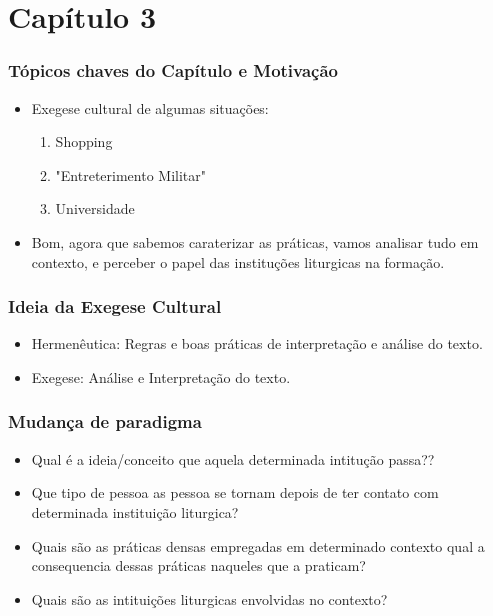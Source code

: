 \section{Capítulo 3}

\begin{frame}
	\frametitle{Tópicos chaves do Capítulo e Motivação}

	\begin{itemize}
		\item <1>Exegese cultural de algumas situações:
        \begin{enumerate}
            \item Shopping
            \item "Entreterimento Militar"
            \item Universidade
        \end{enumerate}
        \item <2>Bom, agora que sabemos caraterizar as práticas, vamos analisar tudo em contexto, e perceber o papel das instituções liturgicas na formação.
	\end{itemize}
\end{frame}

\begin{frame}
	\frametitle{Ideia da Exegese Cultural}

	\begin{itemize}
        \item Hermenêutica: Regras e boas práticas de interpretação e análise do texto.
        \item Exegese: Análise e Interpretação do texto.
	\end{itemize}
\end{frame}

\begin{frame}
	\frametitle{Mudança de paradigma}

	\begin{itemize}
        \item <1>Qual é a ideia/conceito que aquela determinada intitução passa??
        \item <2>Que tipo de pessoa as pessoa se tornam depois de ter contato com determinada instituição liturgica?
        \item <2>Quais são as práticas densas empregadas em determinado contexto qual a consequencia dessas práticas naqueles que a praticam?
        \item <3>Quais são as intituições liturgicas envolvidas no contexto?
	\end{itemize}
\end{frame}